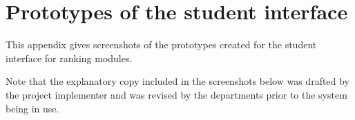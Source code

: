 \documentclass[draft]{scrartcl}
\begin{document}
\begin{figure}[h]
  \begin{center}
  \end{center}
\end{figure}

% 

\clearpage
\section{Prototypes of the student interface}
\label{sec:prototypes}

This appendix gives screenshots of the prototypes created for the student
interface for ranking modules.

Note that the explanatory copy included in the screenshots below was drafted
by the project implementer and was revised by the departments prior to the
system being in use.
\end{document}
